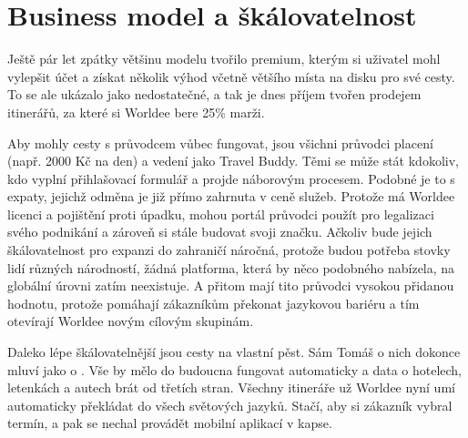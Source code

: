 \section{Business model a škálovatelnost}

Ještě pár let zpátky většinu modelu tvořilo premium, kterým si uživatel mohl vylepšit účet a získat několik výhod včetně většího místa na disku pro své cesty. To se ale ukázalo jako nedostatečné, a tak je dnes příjem tvořen prodejem itinerářů, za které si Worldee bere 25\% marži.

Aby mohly cesty s průvodcem vůbec fungovat, jsou všichni průvodci placení (např. 2000 Kč na den) a vedení jako Travel Buddy. Těmi se může stát kdokoliv, kdo vyplní přihlašovací formulář a projde náborovým procesem. Podobné je to s expaty, jejichž odměna je již přímo zahrnuta v ceně služeb. Protože má Worldee licenci a pojištění proti úpadku, mohou portál průvodci použít pro legalizaci svého podnikání a zároveň si stále budovat svoji značku. Ačkoliv bude jejich škálovatelnost pro expanzi do zahraničí náročná, protože budou potřeba stovky lidí různých národností, žádná platforma, která by něco podobného nabízela, na globální úrovni zatím neexistuje. A přitom mají tito průvodci vysokou přidanou hodnotu, protože pomáhají zákazníkům překonat jazykovou bariéru a tím otevírají Worldee novým cílovým skupinám.

Daleko lépe škálovatelnější jsou cesty na vlastní pěst. Sám Tomáš o nich dokonce mluví jako o . Vše by mělo do budoucna fungovat automaticky a data o hotelech, letenkách a autech brát od třetích stran. Všechny itineráře už Worldee nyní umí automaticky překládat do všech světových jazyků. Stačí, aby si zákazník vybral termín, a pak se nechal provádět mobilní aplikací v kapse.
